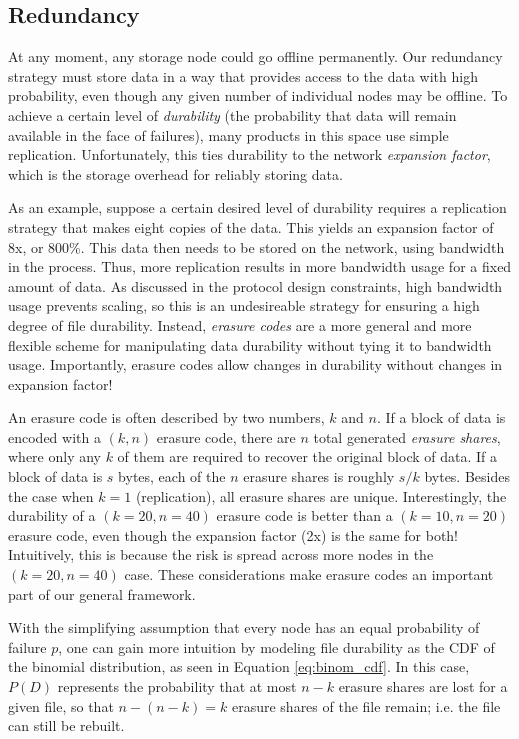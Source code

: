 \documentclass[a4paper,10pt]{article}
\begin{document}
\subsection{Redundancy}

At any moment, any storage node could go offline permanently. Our redundancy
strategy must store data in a way that provides access to the data with high probability, even though any given number of individual nodes may be offline. To achieve a certain level of {\em durability} (the probability that data will remain available in the face of failures), many products in this space use simple replication. Unfortunately, this ties durability to the network {\em expansion factor}, which is the storage overhead for reliably storing data.

As an example, suppose a certain desired level of durability requires a replication strategy that makes eight copies of the data. This yields an expansion factor of 8x, or 800\%. This data then needs to be stored on the network, using bandwidth in the process. Thus, more replication results in more bandwidth usage for a fixed amount of data. As discussed in the protocol design constraints, high bandwidth usage prevents scaling, so this is an undesireable strategy for ensuring a high degree of file durability. Instead, {\em erasure codes} are a more general and more flexible scheme for
manipulating data durability without tying it to bandwidth usage. Importantly, erasure codes allow changes in durability without changes in expansion factor!

An erasure code is often described by two numbers, $k$ and $n$. If a block of
data is encoded with a $(k,n)$ erasure code, there are $n$ total generated
{\em erasure shares}, where only any $k$ of them are required to recover the
original block of data. If a block of data is $s$ bytes, each of the $n$
erasure shares is roughly $s/k$ bytes. Besides the case when $k=1$
(replication), all erasure shares are unique. Interestingly, the durability of a $(k=20,n=40)$ erasure code is better than a $(k=10,n=20)$ erasure code, even though the expansion factor (2x) is the same
for both! Intuitively, this is because the risk is spread across more nodes in
the $(k=20,n=40)$ case. These considerations make erasure codes an important part of our general
framework.

With the simplifying assumption that every node has an equal probability of
failure $p$, one can gain more intuition by modeling file durability as the CDF of the binomial distribution, as seen in Equation \eqref{eq:binom_cdf}. In this case, $P(D)$ represents the probability that at most $n-k$ erasure shares are lost for a given file, so that $n-(n-k)=k$ erasure shares of the file remain; i.e. the file can still be rebuilt.
\end{document}
